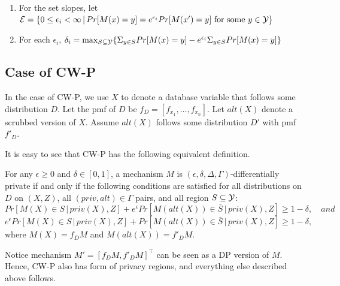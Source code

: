 \documentclass[11pt]{article}
\begin{document}
\begin{enumerate}
\item For the set slopes, let ${\cal E} = \{0 \leq \epsilon_{i} < \infty \,|\, Pr[M(x)=y] = e^{\epsilon_{i}}Pr[M(x')=y] \text{ for some $y \in {\cal Y}$} \}$
\item For each $\epsilon_{i}$,  $\delta_{i} = \max_{S \subseteq {\cal Y}} \{ \Sigma_{y \in S}Pr[M(x)=y] - e^{\epsilon_{i}}\Sigma_{y \in S}Pr[M(x)=y]\}$
\end{enumerate}
\subsection{Case of CW-P}
In the case of CW-P, we use $X$ to denote a database variable that follows some distribution $D$. Let the pmf of $D$ be $f_{D} =[{f_{x_{1}} , \dots, f_{x_{n}}}]$. Let $alt(X)$ denote a scrubbed version of $X$. Assume $alt(X)$ follows some distribution $D'$ with pmf $f'_{D}$.

It is easy to see that CW-P has the following equivalent definition.
\begin{theorem}
For any $\epsilon \geq 0$ and $\delta \in [0, 1]$, a mechanism $M$ is $(\epsilon, \delta,\Delta, \Gamma)$-differentially private if and only if the following conditions are satisfied for all distributions on $D$ on $(X, Z)$, all $(priv, alt) \in \Gamma$ pairs, and all region $S \subseteq {\cal Y}$:
\[
Pr[M(X) \in S \,|\, priv(X), Z]+e^{\epsilon}Pr[M(alt(X)) \in \bar{S}\,|\, priv(X), Z] \geq 1-\delta , \quad and
\]
\[
e^{\epsilon}Pr[M(X) \in S\,|\, priv(X), Z]+Pr[M(alt(X)) \in \bar{S}\,|\, priv(X), Z]  \geq 1-\delta ,
\]
where $M(X) = f_{D}M$ and $M(alt(X))=f'_{D}M$.
\end{theorem}
Notice mechanism $M' = [f_{D}M, f'_{D}M]^{\top}$ can be seen as a DP version of $M$. Hence, CW-P also has form of privacy regions, and everything else described above follows.
\end{document}
